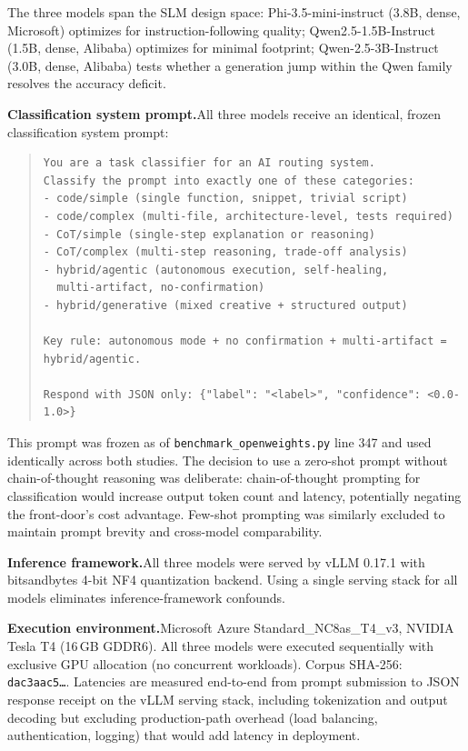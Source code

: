 \documentclass{article}
\begin{document}
The three models span the SLM design space: Phi-3.5-mini-instruct (3.8B, dense, Microsoft) optimizes for instruction-following quality; Qwen2.5-1.5B-Instruct (1.5B, dense, Alibaba) optimizes for minimal footprint; Qwen-2.5-3B-Instruct (3.0B, dense, Alibaba) \citep{yang2024qwen25} tests whether a generation jump within the Qwen family resolves the accuracy deficit.

\textbf{Classification system prompt.}\quad All three models receive an identical, frozen classification system prompt:

\begin{quote}
\small
\begin{verbatim}
You are a task classifier for an AI routing system.
Classify the prompt into exactly one of these categories:
- code/simple (single function, snippet, trivial script)
- code/complex (multi-file, architecture-level, tests required)
- CoT/simple (single-step explanation or reasoning)
- CoT/complex (multi-step reasoning, trade-off analysis)
- hybrid/agentic (autonomous execution, self-healing,
  multi-artifact, no-confirmation)
- hybrid/generative (mixed creative + structured output)

Key rule: autonomous mode + no confirmation + multi-artifact = hybrid/agentic.

Respond with JSON only: {"label": "<label>", "confidence": <0.0-1.0>}
\end{verbatim}
\end{quote}

This prompt was frozen as of \texttt{benchmark\_openweights.py} line 347 and used identically across both studies. The decision to use a zero-shot prompt without chain-of-thought reasoning \citep{wei2022chain,kojima2022zeroshotreasoners} was deliberate: chain-of-thought prompting for classification would increase output token count and latency, potentially negating the front-door's cost advantage. Few-shot prompting \citep{brown2020language,min2022incontext} was similarly excluded to maintain prompt brevity and cross-model comparability.

\textbf{Inference framework.}\quad All three models were served by vLLM 0.17.1 \citep{kwon2023vllm} with bitsandbytes 4-bit NF4 quantization backend. Using a single serving stack for all models eliminates inference-framework confounds.

\textbf{Execution environment.}\quad Microsoft Azure Standard\_NC8as\_T4\_v3, NVIDIA Tesla T4 (16\,GB GDDR6). All three models were executed sequentially with exclusive GPU allocation (no concurrent workloads). Corpus SHA-256: \texttt{dac3aac5\ldots}. Latencies are measured end-to-end from prompt submission to JSON response receipt on the vLLM serving stack, including tokenization and output decoding but excluding production-path overhead (load balancing, authentication, logging) that would add latency in deployment.
\end{document}
